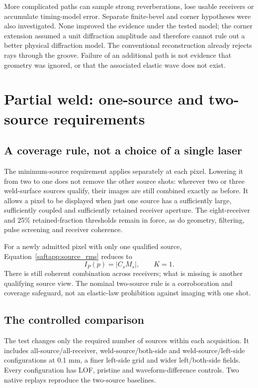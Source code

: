 More complicated paths can sample strong reverberations, lose usable receivers or accumulate timing-model error. Separate finite-bevel and corner hypotheses were also investigated. None improved the evidence under the tested model; the corner extension assumed a unit diffraction amplitude and therefore cannot rule out a better physical diffraction model. The conventional reconstruction already rejects rays through the groove. Failure of an additional path is not evidence that geometry was ignored, or that the associated elastic wave does not exist.


\section{Partial weld: one-source and two-source requirements}
\label{saftapp:archive:partial:one_source}
\subsection{A coverage rule, not a choice of a single laser}
The minimum-source requirement applies separately at each pixel. Lowering it from two to one does not remove the other source shots: wherever two or three weld-surface sources qualify, their images are still combined exactly as before. It allows a pixel to be displayed when just one source has a sufficiently large, sufficiently coupled and sufficiently retained receiver aperture. The eight-receiver and 25\% retained-fraction thresholds remain in force, as do geometry, filtering, pulse screening and receiver coherence.

For a newly admitted pixel with only one qualified source, Equation~\ref{saftapp:source_rms} reduces to
\begin{equation}
 I_P(p)=|C_sM_s|,\qquad K=1.
\end{equation}
There is still coherent combination across receivers; what is missing is another qualifying source view. The nominal two-source rule is a corroboration and coverage safeguard, not an elastic-law prohibition against imaging with one shot.

\subsection{The controlled comparison}
The test changes only the required number of sources within each acquisition. It includes all-source/all-receiver, weld-source/both-side and weld-source/left-side configurations at 0.1 mm, a finer left-side grid and wider left/both-side fields. Every configuration has LOF, pristine and waveform-difference controls. Two native replays reproduce the two-source baselines.

